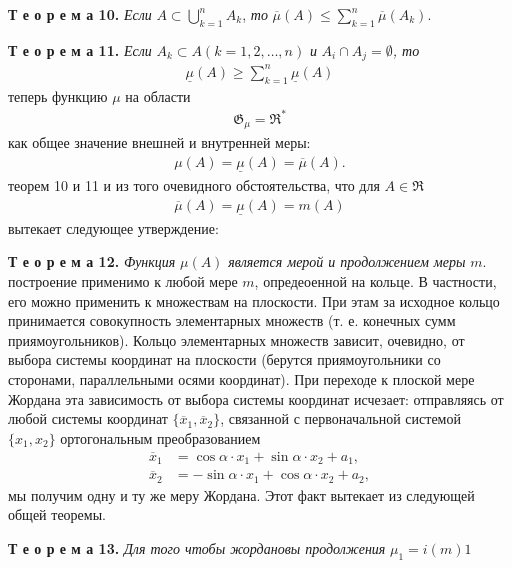 \documentclass[oneside]{book}
\begin{document}
\large
    \textbf{Т е о р е м а 10.} \emph{Если} $A \subset \bigcup_{k=1}^n A_k$, \emph{то} $ \overline{\mu}(A)\leq \sum_{k=1}^n \overline{\mu}(A_k) $.%
    \par\textbf{Т е о р е м а 11.} \emph{Если} $A_k \subset A(k=1, 2, \dots, n)$ \emph{и} $ A_i \cap A_j = \emptyset $\emph{, то}
    \begin{align*}
        \underline{\mu}(A) \geqslant \sum_{k=1}^n \underline{\mu}(A)
    \end{align*}
     теперь функцию $\mu$ на области
    \begin{align*}
        \mathfrak{G}_\mu = \mathfrak{R}^\ast
    \end{align*}
    как общее значение внешней и внутренней меры:
    \begin{align*}
        \mu(A) = \underline{\mu}(A) = \overline{\mu}(A).
    \end{align*}
     теорем 10 и 11 и из того очевидного обстоятельства, что для $A \in \mathfrak{R}$
    \begin{align*}
        \overline{\mu}(A) = \underline{\mu}(A) = m(A)
    \end{align*}
    вытекает следующее утверждение:
    \par\textbf{Т е о р е м а 12.} \emph{Функция} $\mu(A)$ \emph{является мерой и продолжением меры} $m$.
     построение применимо  к любой мере $m$, опредеоенной на кольце.
    В частности, его можно применить к множествам на плоскости. При этам за исходное кольцо принимается совокупность элементарных множеств
    (т. е. конечных сумм приямоугольников). Кольцо элементарных множеств зависит, очевидно, от выбора системы координат на плоскости
    (берутся приямоугольники со сторонами, параллельными осями координат). При переходе к плоской мере Жордана эта зависимость от 
    выбора системы координат исчезает: отправляясь от любой системы координат $\{\overline{x}_1, \overline{x}_2\}$, связанной с первоначальной системой
    $\{x_1, x_2\}$ ортогональным преобразованием
    \begin{align*}
        \overline{x}_1 &= \cos\alpha \cdot x_1 + \sin\alpha \cdot x_2 + a_1,\\
        \overline{x}_2 &= -\sin\alpha\cdot x_1 + \cos\alpha\cdot x_2 + a_2,
    \end{align*}
    мы получим одну и ту же меру Жордана. Этот факт вытекает из следующей общей теоремы.
    \par\textbf{Т е о р е м а 13.} \emph{Для того чтобы жордановы продолжения } $\mu_1 = i(m)1$
\end{document}
